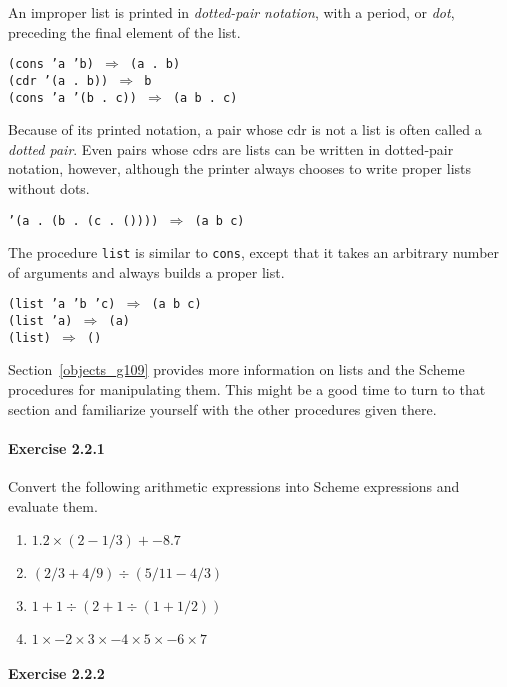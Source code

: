 An improper list is printed in \textit{dotted-pair notation}, with a
period, or \label{start_s30}\label{start_s31}\textit{dot},
preceding the final element of the list.


\begin{alltt}
(cons 'a 'b) \(\Rightarrow\) (a . b)
(cdr '(a . b)) \(\Rightarrow\) b
(cons 'a '(b . c)) \(\Rightarrow\) (a b . c)
\end{alltt}


Because of its printed notation, a pair whose cdr is not a list is
often called a \label{start_s32}\textit{dotted pair}.
Even pairs whose cdrs are lists can be written in dotted-pair
notation, however, although the printer always chooses to write
proper lists without dots.


\texttt{'(a . (b . (c . ()))) \(\Rightarrow\) (a b c)}

The procedure \label{start_s33}\texttt{list} is similar to \texttt{cons}, except that it takes
an arbitrary number of arguments and always builds a proper list.


\begin{alltt}
(list 'a 'b 'c) \(\Rightarrow\) (a b c)
(list 'a) \(\Rightarrow\) (a)
(list) \(\Rightarrow\) ()
\end{alltt}


Section \ref{objects_g109} provides more information on lists and the Scheme
procedures for manipulating them.
This might be a good time to turn to that section and familiarize
yourself with the other procedures given there.


\paragraph{Exercise \label{start_g7}2.2.1}


\label{start_s34}Convert the following arithmetic expressions into Scheme expressions
and evaluate them.


 
 \begin{enumerate}[\it a. ]
\item $1.2 \times (2 - 1/3) + -8.7$
\item $(2/3 + 4/9) \div (5/11 - 4/3)$
\item $1 + 1 \div (2 + 1 \div (1 + 1/2))$
\item $1 \times -2 \times 3 \times -4 \times 5 \times -6 \times 7$
\end{enumerate}




\paragraph{Exercise \label{start_g8}2.2.2}


